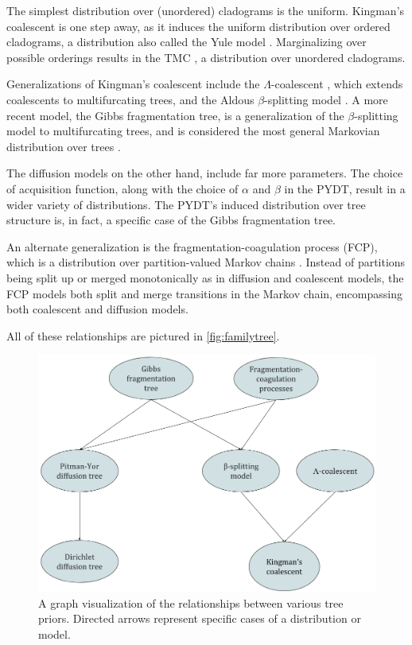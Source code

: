 The simplest distribution over (unordered) cladograms
is the uniform.
Kingman's coalescent is one step away,
as it
induces the uniform distribution
over ordered cladograms,
a distribution also called
the Yule model \citep{Harding1971}.
Marginalizing over possible orderings
results in the TMC \citep{Boyles2012}, a distribution over unordered cladograms.

Generalizations of Kingman's coalescent
include the $\Lambda$-coalescent \citep{Pitman1999},
which extends coalescents to multifurcating trees,
and the Aldous $\beta$-splitting model \citep{Aldous1996}.
A more recent model, the Gibbs fragmentation tree,
is a generalization of the $\beta$-splitting model
to multifurcating trees,
and is considered the most general Markovian distribution over trees \citep{McCullagh2008}.

The diffusion models on the other hand,
include far more parameters.
The choice of acquisition function,
along with the choice of $\alpha$ and $\beta$ in the PYDT,
result in a wider variety of distributions.
The PYDT's induced distribution over tree
structure is, in fact, a specific case
of the Gibbs fragmentation tree.

An alternate generalization is the fragmentation-coagulation process (FCP),
which is a distribution over partition-valued
Markov chains \citep{Teh2011}.
Instead of partitions being
split up or merged monotonically as in
diffusion and coalescent models, the 
FCP models both split and merge
transitions in the Markov chain, encompassing
both coalescent and diffusion models.

All of these relationships are pictured in \autoref{fig:familytree}.

\begin{figure}[H]
  \includegraphics[width=\textwidth]{img/trees/FamilyTree}
  \caption{A graph visualization of the relationships between various
  tree priors. Directed arrows represent
  specific cases of a distribution or model.}
\label{fig:familytree}
\end{figure}

